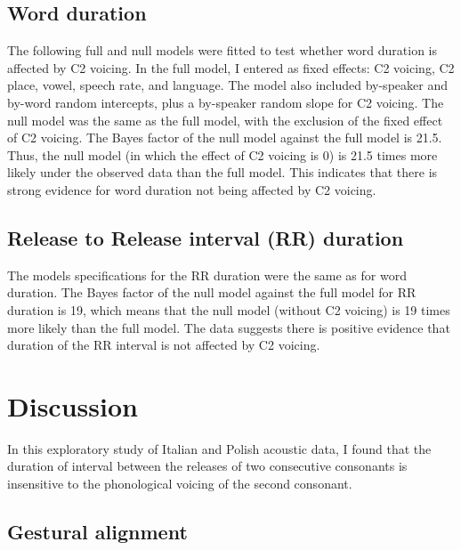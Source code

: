 \documentclass[]{JASAnew}
\begin{document}
\hypertarget{word-duration}{%
\subsection{Word duration}\label{word-duration}}

The following full and null models were fitted to test whether word
duration is affected by C2 voicing. In the full model, I entered as
fixed effects: C2 voicing, C2 place, vowel, speech rate, and language.
The model also included by-speaker and by-word random intercepts, plus a
by-speaker random slope for C2 voicing. The null model was the same as
the full model, with the exclusion of the fixed effect of C2 voicing.
The Bayes factor of the null model against the full model is 21.5. Thus,
the null model (in which the effect of C2 voicing is 0) is 21.5 times
more likely under the observed data than the full model. This indicates
that there is strong evidence for word duration not being affected by C2
voicing.

\hypertarget{release-to-release-interval-rr-duration}{%
\subsection{Release to Release interval (RR)
duration}\label{release-to-release-interval-rr-duration}}

The models specifications for the RR duration were the same as for word
duration. The Bayes factor of the null model against the full model for
RR duration is 19, which means that the null model (without C2 voicing)
is 19 times more likely than the full model. The data suggests there is
positive evidence that duration of the RR interval is not affected by C2
voicing.

\hypertarget{discussion}{%
\section{Discussion}\label{discussion}}

In this exploratory study of Italian and Polish acoustic data, I found
that the duration of interval between the releases of two consecutive
consonants is insensitive to the phonological voicing of the second
consonant.

\hypertarget{gestural-alignment}{%
\subsection{Gestural alignment}\label{gestural-alignment}}
\end{document}
